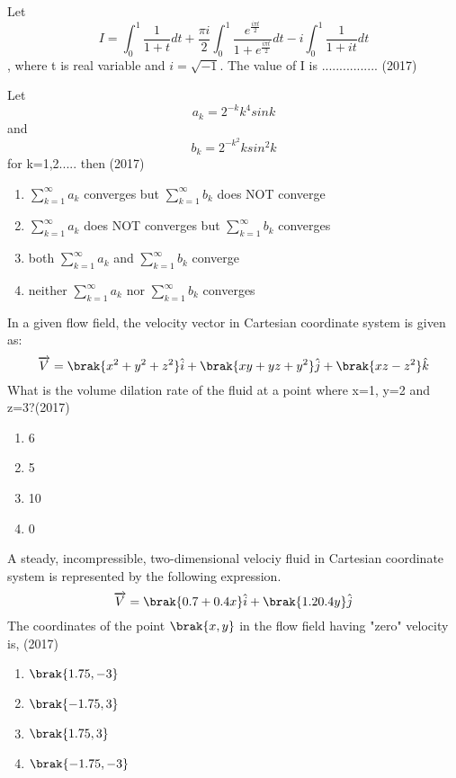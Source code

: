     \item[10.] Let $$I = \int_{0}^{1}\frac{1}{1+t}dt + \frac{\pi i}{2}\int_{0}^{1}\frac{e^{\frac{i\pi t}{2}}}{1+e^{\frac{i\pi t}{2}}}dt - i\int_{0}^{1}\frac{1}{1+it}dt$$, where t is real variable and $i = \sqrt{-1}$. The value of I is ................ \hfill (2017)
    \item[11.] Let $$a_k = 2^{-k}k^4 sink  $$ and $$b_k = 2^{-k^2}ksin^2k$$ for k=1,2..... then \hfill (2017)
    \begin{enumerate}[label=(\Alph*)]
        \item $\sum_{k=1}^{\infty}a_k$ converges but $\sum_{k=1}^{\infty}b_k $ does NOT converge 
        \item $\sum_{k=1}^{\infty}a_k$ does NOT converges but $\sum_{k=1}^{\infty}b_k $ converges 
        \item both $\sum_{k=1}^{\infty}a_k$ and $\sum_{k=1}^{\infty}b_k $ converge 
        \item neither $\sum_{k=1}^{\infty}a_k$ nor $\sum_{k=1}^{\infty}b_k $ converges 
    \end{enumerate}
    \item[12.] In a given flow field, the velocity vector in Cartesian coordinate system is given as:$$\overrightarrow{V}=\brak{x^2+y^2+z^2}\hat{i} +\brak{xy+yz+y^2}\hat{j}+\brak{xz-z^2}\hat{k}  $$What is the volume dilation rate of the fluid at a point where x=1, y=2 and z=3?\hfill (2017)
    \begin{enumerate}[label=(\Alph*)]
        \item 6
        \item 5
        \item 10
        \item 0
    \end{enumerate}
    \item[13.] A steady, incompressible, two-dimensional velociy fluid in Cartesian coordinate system is represented by the following expression.$$\overrightarrow{V} = \brak{0.7+0.4x}\hat{i} + \brak{1.2  0.4y}\hat{j}$$The coordinates of the point $\brak{x,y}$ in the flow field having "zero" velocity is, \hfill (2017)
    \begin{enumerate}[label=(\Alph*)]
        \item $\brak{1.75,-3}$
        \item $\brak{-1.75,3}$
        \item $\brak{1.75,3}$
        \item $\brak{-1.75,-3}$
    \end{enumerate}

